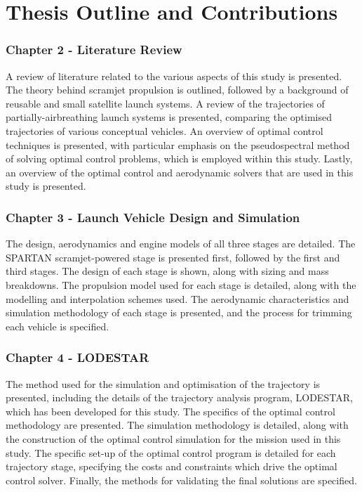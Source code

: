   \clearpage
  \section{Thesis Outline and Contributions}

    

    \subsubsection*{Chapter 2 - Literature Review}

      A review of literature related to the various aspects of this study is presented. The theory behind scramjet propulsion is outlined, followed by a background of reusable and small satellite launch systems. A review of the trajectories of partially-airbreathing launch systems is presented, comparing the optimised trajectories of various conceptual vehicles. An overview of optimal control techniques is presented, with particular emphasis on the pseudospectral method of solving optimal control problems, which is employed within this study. Lastly, an overview of the optimal control and aerodynamic solvers that are used in this study is presented.
      

    \subsubsection*{Chapter 3 - Launch Vehicle Design and Simulation}

      The design, aerodynamics and engine models of all three stages are detailed. The SPARTAN scramjet-powered stage is presented first, followed by the first and third stages. The design of each stage is shown, along with sizing and mass breakdowns. The propulsion model used for each stage is detailed, along with the modelling and interpolation schemes used. The aerodynamic characteristics and simulation methodology of each stage is presented, and the process for trimming each vehicle is specified. 
      
      
      \subsubsection*{Chapter 4 - LODESTAR}
      
      The method used for the simulation and optimisation of the trajectory is presented, including the details of the trajectory analysis program, LODESTAR, which has been developed for this study. The specifics of the optimal control methodology are presented. The simulation methodology is detailed, along with the construction of the optimal control simulation for the mission used in this study. The specific set-up of the optimal control program is detailed for each trajectory stage, specifying the costs and constraints which drive the optimal control solver. Finally, the methods for validating the final solutions are specified.
      
